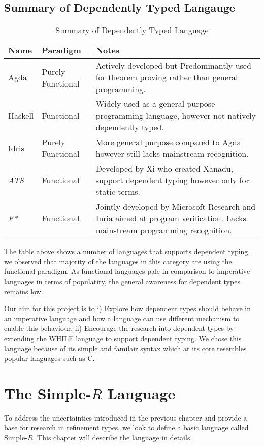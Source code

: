 \documentclass[a4paper,12pt]{report}
\begin{document}
\section{Summary of Dependently Typed Langauge}
\begin{table} [H]
  \begin{tabular}{|p{2cm}|p{2cm}|p{10cm}|}
    \hline
    \textbf{Name} & \textbf{Paradigm} & \textbf{Notes} \\ 
    \hline
    Agda & Purely Functional & Actively developed but 
      Predominantly used for theorem proving rather than general programming. \\ 
    \hline
    Haskell & Functional & Widely used as a general purpose programming language, however not natively dependently typed. \\ 
    \hline
    Idris & Purely Functional & More general purpose compared to Agda however 
      still lacks mainstream recognition. \\
    \hline
    \textit{ATS} \cite{ATS} & Functional & Developed by Xi who created Xanadu, 
      support dependent typing however only for static terms. \\
    \hline
    \textit{F*} \cite{FStar} & Functional & Jointly developed by Microsoft 
    Research and Inria aimed at program verification. Lacks mainstream 
    programming recognition.\\
    \hline
  \end{tabular}
  \caption{Summary of Dependently Typed Language}
\end{table}

\par
The table above shows a number of languages that supports dependent typing, we 
observed that majority of the languages in this category are using the 
functional paradigm. As functional languages pale in comparison to imperative 
languages in terms of populatiry, the general awareness for dependent types 
remains low. 

\par
Our aim for this project is to i) Explore how dependent types should behave in 
an imperative language and how a language can use different mechanism to enable 
this behaviour. ii) Encourage the research into dependent types by extending the 
WHILE language \cite{whileLanguage} to support dependent typing. We chose this 
language because of its simple and familair syntax which at its core resembles 
popular languages such as C. 

\chapter{The Simple-$R$ Language}
To address the uncertainties introduced in the previous chapter and provide a 
base for research in refinement types, we look to 
define a basic language called Simple-$R$. This chapter will describe the 
language in details.
\end{document}
